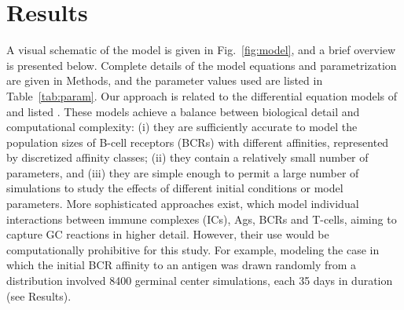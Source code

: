 \documentclass[utf8]{frontiersHLTH}%
\newcommand{\fig}[1]{Fig.~\ref{fig:#1}}
\newcommand{\tab}[1]{Table~\ref{tab:#1}}
\begin{document}
\section{Results}
\label{sec:results}
A visual schematic of the model is given in \fig{model}, and a brief overview is presented below. 
Complete details of the model equations and parametrization are given in Methods, and
the parameter values used are listed in \tab{param}.
Our approach is related to the differential equation models of \citet{kepler93} and listed
\citet{oprea97}. 
These models achieve a balance between biological detail
and computational complexity: 
(i) they are sufficiently accurate to
model the population sizes of B-cell receptors (BCRs) with different
affinities, represented by discretized affinity classes; (ii) they
contain a relatively small number of parameters, and (iii) they are simple enough
to permit a large number of simulations to study the effects of
different initial conditions or model parameters.\cite{kepler93,oprea97}
More sophisticated approaches exist, which model individual interactions
between immune complexes (ICs), Ags, BCRs and T-cells, aiming
to capture GC reactions in higher detail.\cite{meyer-hermann02,meyer-hermann12}
However, their use would be computationally prohibitive for this study. For example,
modeling the case in which the initial BCR affinity to an antigen was drawn randomly from a distribution
involved 8400 germinal center simulations, each 35 days in duration (see Results).
\end{document}
